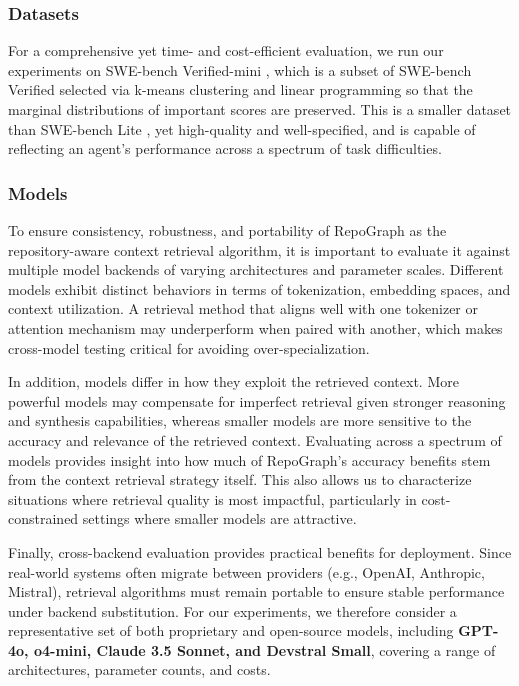 \subsubsection{Datasets}

For a comprehensive yet time- and cost-efficient evaluation, we run our experiments on SWE-bench Verified-mini \cite{MariusHobbhahn2025swe-bench-verified-mini}, which is a subset of SWE-bench Verified \cite{chowdhury2024swebenchverified} selected via k-means clustering and linear programming so that the marginal distributions of important scores are preserved. This is a smaller dataset than SWE-bench Lite \cite{yang2024sweagent}, yet high-quality and well-specified, and is capable of reflecting an agent's performance across a spectrum of task difficulties.

\subsubsection{Models}
\label{sec:ch1_eval_model}
To ensure consistency, robustness, and portability of RepoGraph as the repository-aware context retrieval algorithm, it is important to evaluate it against multiple model backends of varying architectures and parameter scales. Different models exhibit distinct behaviors in terms of tokenization, embedding spaces, and context utilization. A retrieval method that aligns well with one tokenizer or attention mechanism may underperform when paired with another, which makes cross-model testing critical for avoiding over-specialization.

In addition, models differ in how they exploit the retrieved context. More powerful models may compensate for imperfect retrieval given stronger reasoning and synthesis capabilities, whereas smaller models are more sensitive to the accuracy and relevance of the retrieved context. Evaluating across a spectrum of models provides insight into how much of RepoGraph's accuracy benefits stem from the context retrieval strategy itself. This also allows us to characterize situations where retrieval quality is most impactful, particularly in cost-constrained settings where smaller models are attractive.

Finally, cross-backend evaluation provides practical benefits for deployment. Since real-world systems often migrate between providers (e.g., OpenAI, Anthropic, Mistral), retrieval algorithms must remain portable to ensure stable performance under backend substitution. For our experiments, we therefore consider a representative set of both proprietary and open-source models, including \textbf{GPT-4o, o4-mini, Claude 3.5 Sonnet, and Devstral Small}, covering a range of architectures, parameter counts, and costs.

